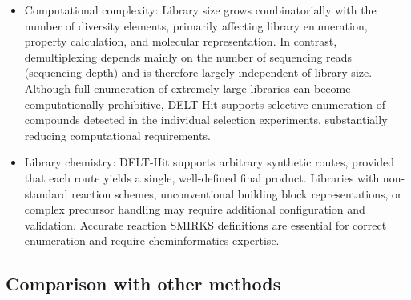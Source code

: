 \begin{itemize}
  \item Computational complexity: Library size grows combinatorially with the number of diversity elements, primarily affecting library enumeration, property calculation, and molecular representation. In contrast, demultiplexing depends mainly on the number of sequencing reads (sequencing depth) and is therefore largely independent of library size. Although full enumeration of extremely large libraries can become computationally prohibitive, DELT-Hit supports selective enumeration of compounds detected in the individual selection experiments, substantially reducing computational requirements.
  \item Library chemistry: DELT-Hit supports arbitrary synthetic routes, provided that each route yields a single, well-defined final product. Libraries with non-standard reaction schemes, unconventional building block representations, or complex precursor handling may require additional configuration and validation. Accurate reaction SMIRKS definitions are essential for correct enumeration and require cheminformatics expertise.
\end{itemize}

\subsection{Comparison with other methods}

